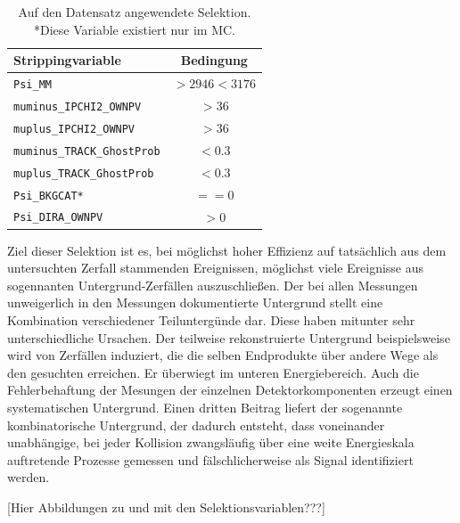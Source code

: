 \begin{table}[htb]
  \centering
  \caption{Auf den Datensatz angewendete Selektion. *Diese Variable existiert nur im MC.}
  \begin{tabular}{lc}
    \toprule
    Strippingvariable                 & Bedingung      \\
    \midrule
    \texttt{Psi\_MM}                  & $>\num{2946}<\num{3176}$  \\
    \texttt{muminus\_IPCHI2\_OWNPV}   & $>\num{36}$  \\
    \texttt{muplus\_IPCHI2\_OWNPV}    & $>\num{36}$  \\
    \texttt{muminus\_TRACK\_GhostProb}& $<\num{0.3}$ \\
    \texttt{muplus\_TRACK\_GhostProb} & $<\num{0.3}$ \\
    \texttt{Psi\_BKGCAT*}             & $==\num{0}$  \\
    \texttt{Psi\_DIRA\_OWNPV}         & $>\num{0}$  \\
    \bottomrule
  \end{tabular}
  \label{tab:strip}
\end{table}

Ziel dieser Selektion ist es, bei möglichst hoher Effizienz auf tatsächlich aus dem untersuchten Zerfall stammenden Ereignissen, möglichst viele Ereignisse aus sogennanten Untergrund-Zerfällen auszuschließen. Der bei allen Messungen unweigerlich in den Messungen dokumentierte Untergrund stellt eine Kombination verschiedener Teiluntergünde dar. Diese haben mitunter sehr unterschiedliche Ursachen. Der teilweise rekonstruierte Untergrund beispielsweise wird von Zerfällen induziert, die die selben Endprodukte über andere Wege als den gesuchten erreichen. Er überwiegt im unteren Energiebereich. Auch die Fehlerbehaftung der Mesungen der einzelnen Detektorkomponenten erzeugt einen systematischen Untergrund. Einen dritten Beitrag liefert der sogenannte kombinatorische Untergrund, der dadurch entsteht, dass voneinander unabhängige, bei jeder Kollision zwangsläufig über eine weite Energieskala auftretende Prozesse gemessen und fälschlicherweise als Signal identifiziert werden.

[Hier Abbildungen zu und mit den Selektionsvariablen???]

